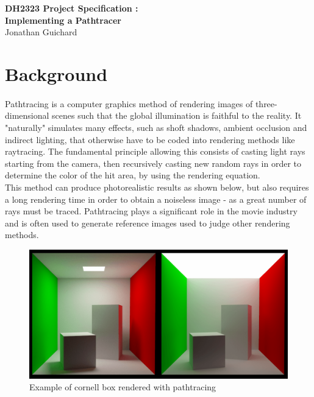 \documentclass[12pt, oneside]{report}
\begin{document}
\begin{center}
\Large{
\textbf{DH2323 Project Specification : \\ Implementing a Pathtracer}
} 
\medskip
\small{\\Jonathan Guichard}
\end{center}

\bigskip

\section*{Background}

\paragraph{}Pathtracing is a computer graphics method of rendering images of three-dimensional scenes such that the global illumination is faithful to the reality. It "naturally" simulates many effects, such as shoft shadows, ambient occlusion and indirect lighting, that otherwise have to be coded into rendering methods like raytracing. The fundamental principle allowing this consists of casting light rays starting from the camera, then recursively casting new random rays in order to determine the color of the hit area, by using the rendering equation. \\
This method can produce photorealistic results as shown below, but also requires a long rendering time in order to obtain a noiseless image - as a great number of rays must be traced. Pathtracing plays a significant role in the movie industry and is often used to generate reference images used to judge other rendering methods.

\medskip

\begin{figure}[h]
  \centering
    \includegraphics[scale=0.4]{example.png}
    \caption{Example of cornell box rendered with pathtracing}
\end{figure}
\end{document}

